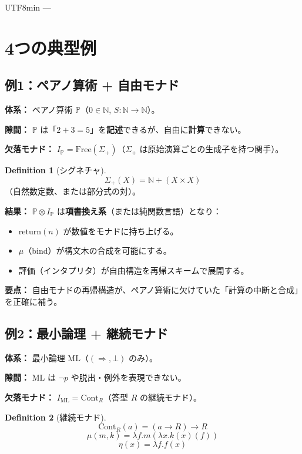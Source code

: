 \documentclass[a4paper,11pt]{article}
\renewcommand{\emph}[1]{\textbf{#1}}
\theoremstyle{definition}
\newtheorem{definition}{Definition}[section]
\begin{document}
\begin{CJK}{UTF8}{min}
---

\section{4つの典型例}

\subsection{例1：ペアノ算術 + 自由モナド}

\textbf{体系：} ペアノ算術 $\mathbb{P}$（$0 \in \mathbb{N}$, $S : \mathbb{N} \to \mathbb{N}$）。

\textbf{隙間：} $\mathbb{P}$ は「$2+3=5$」を\emph{記述}できるが、自由に\emph{計算}できない。

\textbf{欠落モナド：} $I_{\mathbb{P}} = \text{Free}(\Sigma_+)$（$\Sigma_+$ は原始演算ごとの生成子を持つ関手）。

\begin{definition}[シグネチャ]
\[\Sigma_+(X) = \mathbb{N} + (X \times X)\]
（自然数定数、または部分式の対）。
\end{definition}

\textbf{結果：} $\mathbb{P} \otimes I_{\mathbb{P}}$ は\emph{項書換え系}（または純関数言語）となり：
\begin{itemize}
  \item $\text{return}(n)$ が数値をモナドに持ち上げる。
  \item $\mu$（bind）が構文木の合成を可能にする。
  \item 評価（インタプリタ）が自由構造を再帰スキームで展開する。
\end{itemize}

\textbf{要点：} 自由モナドの再帰構造が、ペアノ算術に欠けていた「計算の中断と合成」を正確に補う。

\subsection{例2：最小論理 + 継続モナド}

\textbf{体系：} 最小論理 $\text{ML}$（$(\Rightarrow, \bot)$ のみ）。

\textbf{隙間：} $\text{ML}$ は $\neg p$ や脱出・例外を表現できない。

\textbf{欠落モナド：} $I_{\text{ML}} = \text{Cont}_R$（答型 $R$ の継続モナド）。

\begin{definition}[継続モナド]
\[\text{Cont}_R(a) = (a \to R) \to R\]
\[\mu(m, k) = \lambda f. m(\lambda x. k(x)(f))\]
\[\eta(x) = \lambda f. f(x)\]
\end{definition}


\end{CJK}
\end{document}

